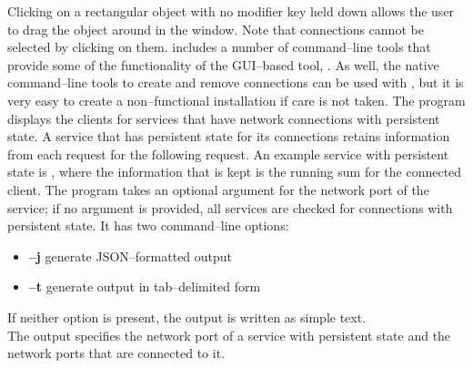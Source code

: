 Clicking on a rectangular object with no modifier key held down allows the user to drag
the object around in the window.
Note that connections cannot be selected by clicking on them.
\secondaryEnd{}
\newpage
{}
\mplusm{} includes a number of command--line tools that provide some of the functionality
of the GUI--based tool, .
As well, the native \yarp{} command--line tools to create and remove connections can be
used with \mplusm{}, but it is very easy to create a non--functional installation if care
is not taken.
The program  displays the clients for services that have
\yarp{} network connections with persistent state.
A service that has persistent state for its connections retains information from each
request for the following request.
An example service with persistent state is
, where the information that is kept is the
running sum for the connected client.
The program takes an optional argument for the \yarp{} network port of the service; if no
argument is provided, all services are checked for connections with persistent state.
It has two command--line options:
\begin{itemize}
\item \textbf{--j} generate JSON--formatted output
\item \textbf{--t} generate output in tab--delimited form
\end{itemize}
If neither option is present, the output is written as simple text.\\

The output specifies the \yarp{} network port of a service with persistent state and the
\yarp{} network ports that are connected to it.\\

